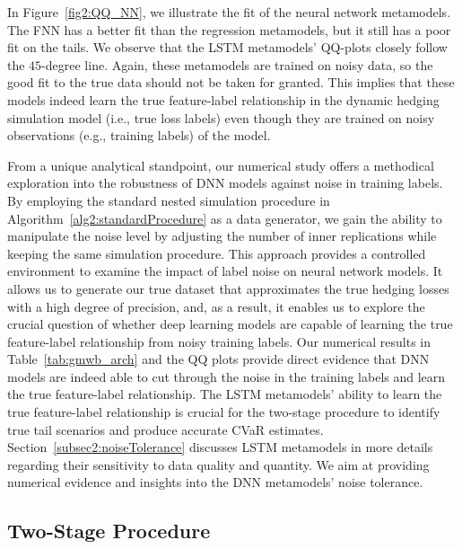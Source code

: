 In Figure~\ref{fig2:QQ_NN}, we illustrate the fit of the neural network metamodels.
The FNN has a better fit than the regression metamodels, but it still has a poor fit on the tails.
We observe that the LSTM metamodels' QQ-plots closely follow the $45$-degree line.
Again, these metamodels are trained on noisy data, so the good fit to the true data should not be taken for granted.
This implies that these models indeed learn the true feature-label relationship in the dynamic hedging simulation model (i.e., true loss labels) even though they are trained on noisy observations (e.g., training labels) of the model.

From a unique analytical standpoint, our numerical study offers a methodical exploration into the robustness of DNN models against noise in training labels. 
By employing the standard nested simulation procedure in Algorithm~\ref{alg2:standardProcedure} as a data generator, we gain the ability to manipulate the noise level by adjusting the number of inner replications while keeping the same simulation procedure.
This approach provides a controlled environment to examine the impact of label noise on neural network models.
It allows us to generate our true dataset that approximates the true hedging losses with a high degree of precision, and, as a result, it enables us to explore the crucial question of whether deep learning models are capable of learning the true feature-label relationship from noisy training labels.
Our numerical results in Table~\ref{tab:gmwb_arch} and the QQ plots provide direct evidence that DNN models are indeed able to cut through the noise in the training labels and learn the true feature-label relationship.
The LSTM metamodels' ability to learn the true feature-label relationship is crucial for the two-stage procedure to identify true tail scenarios and produce accurate CVaR estimates.
Section~\ref{subsec2:noiseTolerance} discusses LSTM metamodels in more details regarding their sensitivity to data quality and quantity.
We aim at providing numerical evidence and insights into the DNN metamodels' noise tolerance.

\subsection{Two-Stage Procedure} \label{subsec:twoStageProcedure}

